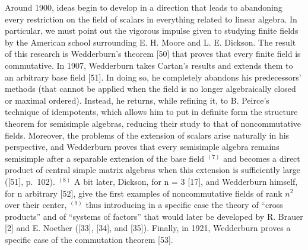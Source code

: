 Around 1900, ideas begin to develop in a direction that leads to abandoning every restriction on the field of scalars in everything related to linear algebra. In particular, we must point out the vigorous impulse given to studying finite fields by the American school surrounding E. H. Moore and L. E. Dickson. The result of this research is Wedderburn's theorem {[}50{]} that proves that every finite field is commutative. In 1907, Wedderburn takes Cartan's results and extends them to an arbitrary base field {[}51{]}. In doing so, he completely abandons his predecessors' methods (that cannot be applied when the field is no longer algebraically closed or maximal ordered). Instead, he returns, while refining it, to B. Peirce's technique of idempotents, which allows him to put in definite form the structure theorem for semisimple algebras, reducing their study to that of noncommutative fields. Moreover, the problems of the extension of scalars arise naturally in his perspective, and Wedderburn proves that every semisimple algebra remains semisimple after a separable extension of the base field \(^{(7)}\) and becomes a direct product of central simple matrix algebras when this extension is sufficiently large ({[}51{]}, p.~102). \(^{(8)}\) A bit later, Dickson, for n = 3 {[}17{]}, and Wedderburn himself, for n arbitrary {[}52{]}, give the first examples of noncommutative fields of rank \(n^{2}\) over their center, \(^{(9)}\) thus introducing in a specific case the theory of ``cross products'' and of ``systems of factors'' that would later be developed by R. Brauer {[}2{]} and E. Noether ({[}33{]}, {[}34{]}, and {[}35{]}). Finally, in 1921, Wedderburn proves a specific case of the commutation theorem {[}53{]}.

